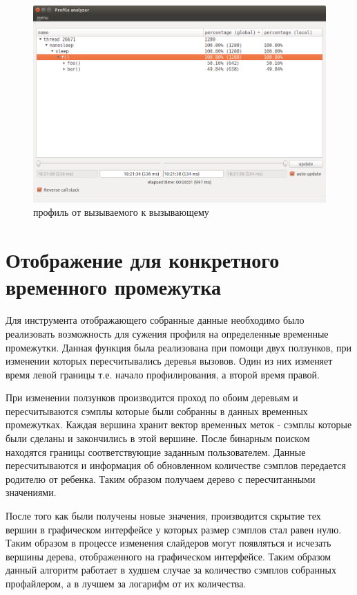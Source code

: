     \begin{figure}[H]
        \caption{профиль от вызываемого к вызывающему}
        \label{fig:down-top}
        \centering
        \includegraphics[scale=0.47]{images/down-top}
    \end{figure}
    

\section{Отображение для конкретного временного промежутка}
	Для инструмента отображающего собранные данные необходимо было реализовать возможность для сужения профиля на определенные временные промежутки. Данная функция была реализована при помощи двух ползунков, при изменении которых пересчитывались деревья вызовов. Один из них изменяет время левой границы т.е. начало профилирования, а второй время правой.
    
    При изменении ползунков производится проход по обоим деревьям и пересчитываются сэмплы которые были собранны в данных временных промежутках. Каждая вершина хранит вектор временных меток - сэмплы которые были сделаны и закончились в этой вершине. После бинарным поиском находятся границы соответствующие заданным пользователем. Данные пересчитываются и информация об обновленном количестве сэмплов передается родителю от ребенка. Таким образом получаем дерево с пересчитанными значениями.
    
    После того как были получены новые значения, производится скрытие тех вершин в графическом интерфейсе у которых размер сэмплов стал равен нулю. Таким образом в процессе изменения слайдеров могут появляться и исчезать вершины дерева, отображенного на графическом интерфейсе. Таким образом данный алгоритм работает в худшем случае за количество сэмплов собранных профайлером, а в лучшем за логарифм от их количества. 
    
